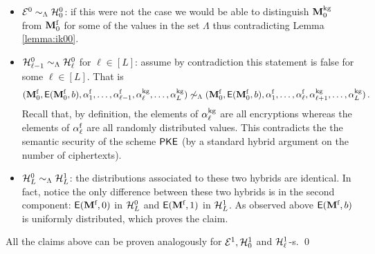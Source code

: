 \begin{itemize}
\item $\mathcal{E}^{0} \sim_{\Lambda} \mathcal{H}^{0}_0$: if this were not the case we would be able to distinguish $\mathbf{M}^{\text{kg}}_0$ from $\mathbf{M}^{\mathcal{\text{f}}}_0$ for some of the values in the set $\Lambda$ thus contradicting Lemma \ref{lemma:ik00}.
\item $\mathcal{H}^{0}_{\ell-1} \sim_{\Lambda} \mathcal{H}^{0}_{\ell}$ for $\ell \in [L]$: assume by contradiction this statement is false for some $\ell \in [L]$. That is 
\[
(\mathbf{M}^{\mathcal{\text{f}}}_0, \mathsf{E}(\mathbf{M}^{\mathcal{\text{f}}}_0, b), \mathbf{\alpha}^{\text{f}}_1, \dots, \mathbf{\alpha}^{\text{f}}_{\ell-1}, \mathbf{\alpha}^{\text{kg}}_{\ell}, \dots, \mathbf{\alpha}^{\text{kg}}_L) \not \sim_{\Lambda} 
(\mathbf{M}^{\mathcal{\text{f}}}_0, \mathsf{E}(\mathbf{M}^{\mathcal{\text{f}}}_0, b), \mathbf{\alpha}^{\text{f}}_1, \dots, \mathbf{\alpha}^{\text{f}}_{\ell}, \mathbf{\alpha}^{\text{kg}}_{\ell+1}, \dots, \mathbf{\alpha}^{\text{kg}}_L) \, .
\]
Recall that, by definition, the elements of $\mathbf{\alpha}^{\text{kg}}_{\ell}$ are all encryptions whereas the elements of $\mathbf{\alpha}^{\text{f}}_{\ell}$ are all randomly distributed values. This contradicts the the semantic security of the scheme $\mathsf{PKE}$ (by a standard hybrid argument on the number of ciphertexts). 


\item $\mathcal{H}^{0}_{L} \sim_{\Lambda} \mathcal{H}^1_{L}$: the distributions associated to these two hybrids are identical. In fact, notice the only difference between these two hybrids is in the second component: $\mathsf{E}(\mathbf{M}^{\mathcal{\text{f}}}, 0)$ in $\mathcal{H}^{0}_{L}$ and $\mathsf{E}(\mathbf{M}^{\mathcal{\text{f}}}, 1)$ in $\mathcal{H}^1_{L}$. As observed above $\mathsf{E}(\mathbf{M}^{\mathcal{\text{f}}}, b)$ is uniformly distributed, which proves the claim.
\end{itemize}

All the claims above can be proven analogously for  $\mathcal{E}^1, \mathcal{H}^1_{0}$  and $\mathcal{H}^1_{\ell}$-s.
\qed